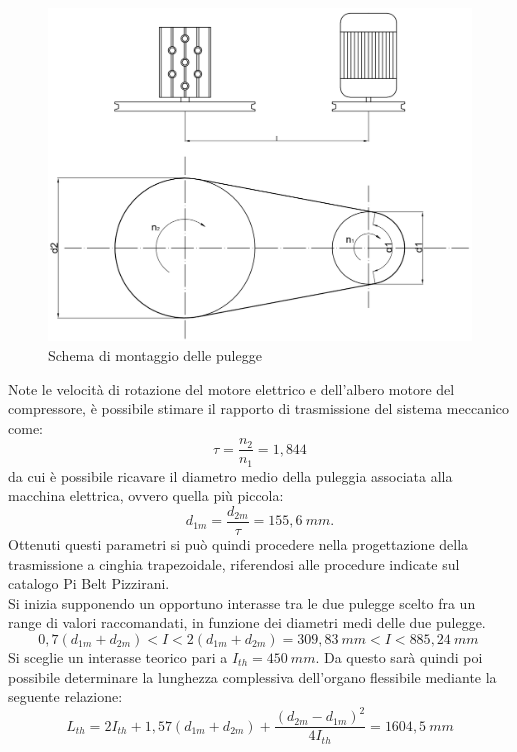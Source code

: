 \begin{figure}[h]
    \centering
    \includegraphics[scale=0.55]{Immagini/SchemaMontaggio.png}
    \caption{Schema di montaggio delle pulegge}
    \label{fig:SchemaMontaggio}
\end{figure}
Note le velocità di rotazione del motore elettrico e dell’albero motore del compressore, è possibile stimare il rapporto di trasmissione del sistema meccanico come:
\begin{equation}
    \tau=\frac{n_2}{n_1}=1,844
\end{equation}
da cui è possibile ricavare il diametro medio della puleggia associata alla macchina elettrica, ovvero quella più piccola:
\begin{equation}
    d_{1m}=\frac{d_{2m}}{\tau}=155,6\ mm.
\end{equation}
Ottenuti questi parametri si può quindi procedere nella progettazione della trasmissione a cinghia trapezoidale, riferendosi alle procedure indicate sul catalogo Pi Belt Pizzirani. \\
Si inizia supponendo un opportuno interasse tra le due pulegge scelto fra un range di valori raccomandati, in funzione dei diametri medi delle due pulegge. 
\begin{equation}
    0,7(d_{1m}+d_{2m})<I<2(d_{1m}+d_{2m})=309,83\ mm<I<885,24\ mm\ 
\end{equation}
Si sceglie un interasse teorico pari a $I_{th}=450\ mm$.
Da questo sarà quindi poi possibile determinare la lunghezza complessiva dell’organo flessibile mediante la seguente relazione: 
\begin{equation}
    L_{th}=2I_{th}+1,57\left(d_{1m}+d_{2m}\right)+\frac{\left(d_{2m}-d_{1m}\right)^2}{4 I_{th}}=1604,5\ mm
\end{equation}
